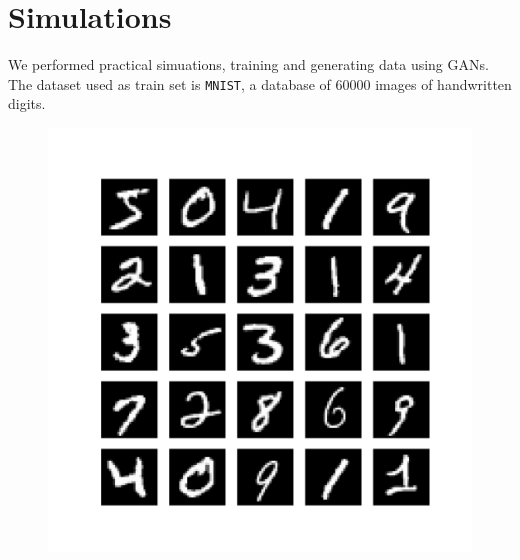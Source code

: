 \documentclass{beamer}
\begin{document}
	\section{Simulations}

	\begin{frame}
		We performed practical simuations, training and generating data using GANs. The dataset used as train set is \texttt{MNIST}, a database of $60000$ images of handwritten digits.
		\begin{figure}[H]
			\begin{center}
				\includegraphics[scale = 0.3, trim = {0 3cm 0 3cm},clip]{head_mnist_data.pdf}
			\end{center}
		\end{figure}
	\end{frame}
\end{document}
